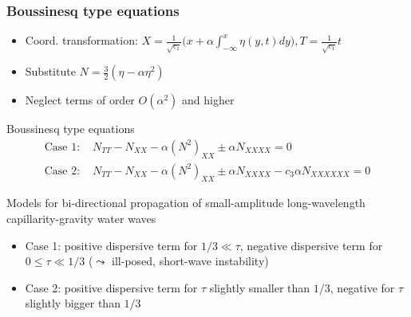 \documentclass[9pt, english]{beamer}
\theoremstyle{definition}
\begin{document}
\begin{frame}
  \frametitle{Boussinesq type equations}
  \begin{itemize}
   \item Coord. transformation: $X=\frac{1}{\sqrt{c_1}}\Big(x+\alpha\int_{-\infty}^x\eta(y,t)dy\Big),
T=\frac{1}{\sqrt{c_1}}t$
   \item Substitute $N=\frac{3}{2}(\eta-\alpha\eta^2)$
   \item Neglect terms of order $O(\alpha^2)$ and higher
  \end{itemize}
\begin{block}{Boussinesq type equations}
\begin{equation*}\begin{aligned}
\mbox{Case 1: } &N_{TT} - N_{XX} - \alpha (N^2)_{XX} \pm\alpha N_{XXXX} = 0 \\
\mbox{Case 2: } &N_{TT} - N_{XX} - \alpha (N^2)_{XX} \pm\alpha
N_{XXXX} -c_3\alpha N_{XXXXXX} = 0
\end{aligned}\end{equation*}
\end{block}
Models for bi-directional propagation of small-amplitude
long-wavelength capillarity-gravity water waves
  \begin{itemize}
   \item Case 1: positive dispersive term for $1/3\ll\tau$, negative dispersive term for $0\le\tau\ll 1/3$ ($\leadsto$
ill-posed, short-wave instability)
   \item Case 2: positive dispersive term for $\tau$ slightly smaller than $1/3$, negative for $\tau$
slightly bigger than $1/3$
 \end{itemize}
\end{frame}
\end{document}
